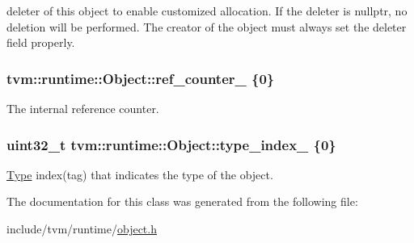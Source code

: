 deleter of this object to enable customized allocation. If the deleter is nullptr, no deletion will be performed. The creator of the object must always set the deleter field properly. 

\subsubsection[{\texorpdfstring{ref\+\_\+counter\+\_\+}{ref_counter_}}]{ tvm\+::runtime\+::\+Object\+::ref\+\_\+counter\+\_\+ \{0\}\hspace{0.3cm}{\ttfamily [protected]}}\hypertarget{classtvm_1_1runtime_1_1Object_a0d492efee331e2239a093f4b2017c10f}{}\label{classtvm_1_1runtime_1_1Object_a0d492efee331e2239a093f4b2017c10f}


The internal reference counter. 

\subsubsection[{\texorpdfstring{type\+\_\+index\+\_\+}{type_index_}}]{\setlength{\rightskip}{0pt plus 5cm}uint32\+\_\+t tvm\+::runtime\+::\+Object\+::type\+\_\+index\+\_\+ \{0\}\hspace{0.3cm}{\ttfamily [protected]}}\hypertarget{classtvm_1_1runtime_1_1Object_a4bfc2586cb55f2af47728187b3256255}{}\label{classtvm_1_1runtime_1_1Object_a4bfc2586cb55f2af47728187b3256255}


\hyperlink{classtvm_1_1Type}{Type} index(tag) that indicates the type of the object. 



The documentation for this class was generated from the following file\+:\begin{DoxyCompactItemize}
\item 
include/tvm/runtime/\hyperlink{object_8h}{object.\+h}\end{DoxyCompactItemize}
